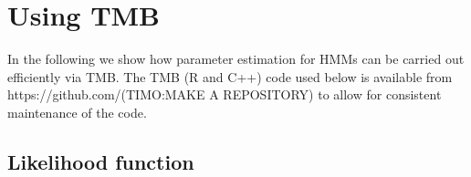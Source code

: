 \documentclass[bimj,fleqn]{w-art}\usepackage[]{graphicx}\usepackage[]{color}
\theoremstyle{plain}
\theoremstyle{definition}
\begin{document}
% 
% 
% 
% 
% 
% 
% 
% 
% 


\section{Using TMB}
\label{sec:tmb}

In the following we show how parameter estimation for HMMs can be carried out  efficiently via TMB. The TMB (R and C++) code used below is available from
https://github.com/(TIMO:MAKE A REPOSITORY) to allow for consistent maintenance of the code. 

\subsection{Likelihood function}
\label{sec:tmb_cpp}
\end{document}
